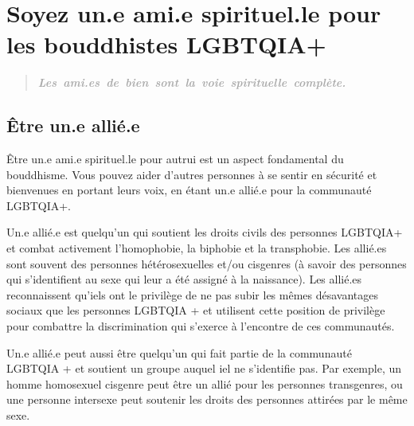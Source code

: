 \documentclass[12pt,openany]{book}
\begin{document}
\chapter*{Soyez un.e ami.e spirituel.le pour les bouddhistes \mbox{LGBTQIA+}}

\begingroup
\addtolength\leftmargin{-0.1in}
\begin{quote}
\textit{\large \textbf{\textcolor{darkgray}{\mbox{Les ami.es de bien sont la voie spirituelle complète.}}}}
\end{quote}
\endgroup

\section*{Être un.e allié.e}

\noindent Être un.e ami.e spirituel.le pour autrui est un aspect fondamental du bouddhisme. Vous pouvez aider d’autres personnes à se sentir en sécurité et bienvenues en portant leurs voix, en étant un.e allié.e pour la communauté \mbox{LGBTQIA+}.

Un.e allié.e est quelqu’un qui soutient les droits civils des personnes \mbox{LGBTQIA+} et combat activement l’homophobie, la biphobie et la transphobie. Les allié.es sont souvent des personnes hétérosexuelles et/ou cisgenres (à savoir des personnes qui s’identifient au sexe qui leur a été assigné à la naissance). Les allié.es reconnaissent qu’iels ont le privilège de ne pas subir les mêmes désavantages sociaux que les personnes LGBTQIA + et utilisent cette position de privilège pour combattre la discrimination qui s’exerce à l’encontre de ces communautés.

Un.e allié.e peut aussi être quelqu’un qui fait partie de la communauté LGBTQIA + et soutient un groupe auquel iel ne s’identifie pas. Par exemple, un homme homosexuel cisgenre peut être un allié pour les personnes transgenres, ou une personne intersexe peut soutenir les droits des personnes attirées par le même sexe.
\end{document}
